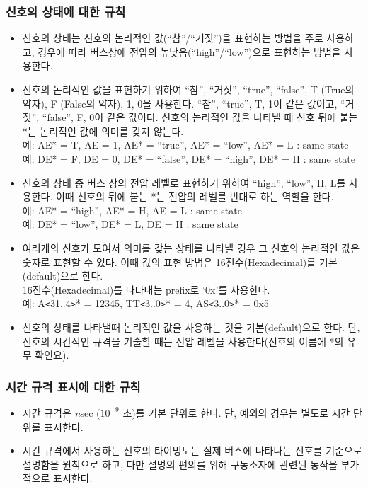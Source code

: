\subsubsection{신호의 상태에 대한 규칙}
\begin{itemize}
  \item 신호의 상태는 신호의 논리적인 값(``참''/``거짓'')을 표현하는 방법을 주로 사용하고,
	경우에 따라 버스상에 전압의 높낮음(``high''/``low'')으로 표현하는 방법을 사용한다.
  \item 신호의 논리적인 값을 표현하기 위하여 ``참'', ``거짓'', ``true'', ``false'', 
	T (True의 약자), F (False의 약자), 1, 0을 사용한다.
	``참'', ``true'', T, 1이 같은 값이고, ``거짓'', ``false'', F, 0이 같은 값이다.
	신호의 논리적인 값을 나타낼 때 신호 뒤에 붙는 *는 논리적인 값에 의미를 갖지 않는다. \\
	예: AE* = T, AE = 1, AE* = ``true'', AE* = ``low'', AE* = L : same state \\
	예: DE* = F, DE = 0, DE* = ``false'', DE* = ``high'', DE* = H : same state
  \item 신호의 상태 중 버스 상의 전압 레벨로 표현하기 위하여 ``high'', ``low'', H, L를 사용한다.
	이때 신호의 뒤에 붙는 *는 전압의 레벨를 반대로 하는 역할을 한다. \\
	예: AE* = ``high'', AE* = H, AE = L : same state \\
	예: DE* = ``low'', DE* = L, DE = H : same state
  \item 여러개의 신호가 모여서 의미를 갖는 상태를 나타낼 경우 그 신호의 논리적인
	값은 숫자로 표현할 수 있다. 이때 값의 표현 방법은 
	16진수(Hexadecimal)를 기본(default)으로 한다. \\
	16진수(Hexadecimal)를 나타내는 prefix로 `0x'를 사용한다. \\
	예: A{\tt <}31..4{\tt >}* = 12345,
	TT{\tt <}3..0{\tt >}* = 4, AS{\tt <}3..0{\tt >}* = 0x5
  \item 신호의 상태를 나타낼때 논리적인 값을 사용하는 것을 기본(default)으로 한다. 
	단, 신호의 시간적인 규격을 기술할 때는 전압 레벨을 사용한다(신호의 이름에 
	*의 유무 확인요).
\end{itemize}
%

\subsubsection{시간 규격 표시에 대한 규칙}
\begin{itemize}
  \item 시간 규격은 {\it n\/}sec ($10^{-9}$ 초)를 기본 단위로 한다.
	단, 예외의 경우는 별도로 시간 단위를 표시한다.
  \item 시간 규격에서 사용하는 신호의 타이밍도는 실제 버스에 나타나는 신호를 기준으로 
	설명함을 원칙으로 하고,
	다만 설명의 편의를 위해 구동소자에 관련된 동작을 부가적으로 표시한다.
\end{itemize}
%


